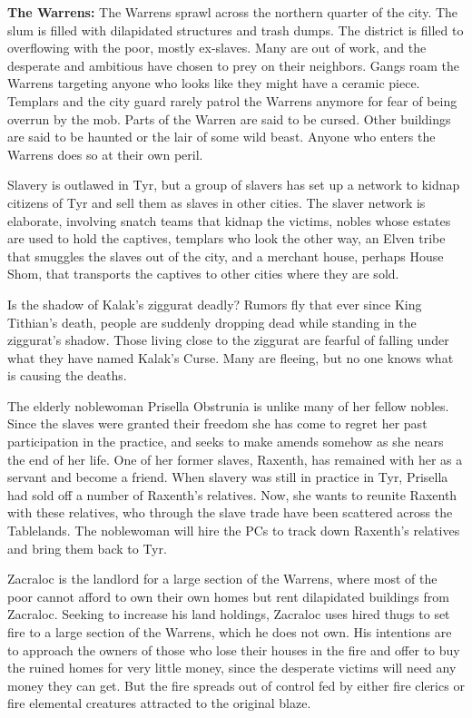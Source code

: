 {	\textbf{The Warrens:} The Warrens sprawl across the northern quarter of the city. The slum is filled with dilapidated structures and trash dumps. The district is filled to overflowing with the poor, mostly ex-slaves. Many are out of work, and the desperate and ambitious have chosen to prey on their neighbors. Gangs roam the Warrens targeting anyone who looks like they might have a ceramic piece. Templars and the city guard rarely patrol the Warrens anymore for fear of being overrun by the mob. Parts of the Warren are said to be cursed. Other buildings are said to be haunted or the lair of some wild beast. Anyone who enters the Warrens does so at their own peril.
}
{
	\item Slavery is outlawed in Tyr, but a group of slavers has set up a network to kidnap citizens of Tyr and sell them as slaves in other cities. The slaver network is elaborate, involving snatch teams that kidnap the victims, nobles whose estates are used to hold the captives, templars who look the other way, an Elven tribe that smuggles the slaves out of the city, and a merchant house, perhaps House Shom, that transports the captives to other cities where they are sold.
	\item Is the shadow of Kalak's ziggurat deadly? Rumors fly that ever since King Tithian's death, people are suddenly dropping dead while standing in the ziggurat's shadow. Those living close to the ziggurat are fearful of falling under what they have named Kalak's Curse. Many are fleeing, but no one knows what is causing the deaths.
	\item The elderly noblewoman Prisella Obstrunia is unlike many of her fellow nobles. Since the slaves were granted their freedom she has come to regret her past participation in the practice, and seeks to make amends somehow as she nears the end of her life. One of her former slaves, Raxenth, has remained with her as a servant and become a friend. When slavery was still in practice in Tyr, Prisella had sold off a number of Raxenth's relatives. Now, she wants to reunite Raxenth with these relatives, who through the slave trade have been scattered across the Tablelands. The noblewoman will hire the PCs to track down Raxenth's relatives and bring them back to Tyr.
	\item Zacraloc is the landlord for a large section of the Warrens, where most of the poor cannot afford to own their own homes but rent dilapidated buildings from Zacraloc. Seeking to increase his land holdings, Zacraloc uses hired thugs to set fire to a large section of the Warrens, which he does not own. His intentions are to approach the owners of those who lose their houses in the fire and offer to buy the ruined homes for very little money, since the desperate victims will need any money they can get. But the fire spreads out of control fed by either fire clerics or fire elemental creatures attracted to the original blaze.
}
